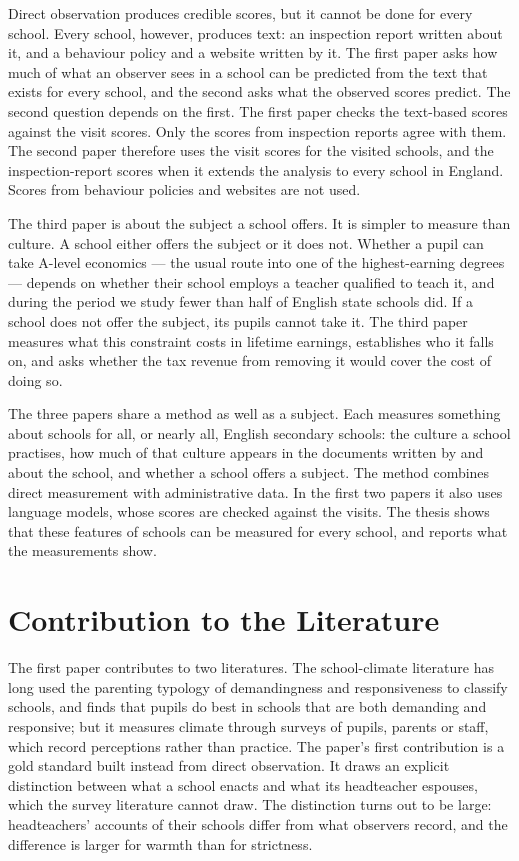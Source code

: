 Direct observation produces credible scores, but it cannot be done for
every school. Every school, however, produces text: an
inspection report written about it, and a behaviour policy and a website
written by it. The first paper asks how much of what an observer sees in a school
can be predicted from the text that exists for every school, and the second asks
what the observed scores predict. The second question depends on the
first. The first paper checks the text-based scores against the visit
scores. Only the scores from inspection reports agree with them. The second
paper therefore uses the visit scores for the visited schools, and the
inspection-report scores when it extends the analysis to every school in
England. Scores from behaviour policies and websites are not used.

The third paper is about the subject a school offers. It is simpler to measure than
culture. A school either offers the subject or it does not. Whether a pupil can take A-level
economics --- the usual route into one of the highest-earning degrees
--- depends on whether their school employs a teacher qualified to teach
it, and during the period we study fewer than half of English state
schools did. If a school does not offer the subject, its pupils cannot take
it. The
third paper measures what this constraint costs in lifetime earnings,
establishes who it falls on, and asks whether the tax revenue from removing
it would cover the cost of doing so.

The three papers share a method as well as a subject. Each measures
something about schools for all, or nearly all, English secondary schools:
the culture a school practises, how much of that culture appears in the
documents written by and about the school, and whether a school offers a
subject. The method combines direct measurement with
administrative data. In the first two papers it also uses language models,
whose scores are checked against the visits. The thesis shows that these
features of schools can be measured for every school, and reports what the
measurements show.

\section{Contribution to the Literature}
\label{sec:intro_contribution}

The first paper contributes to two literatures. The school-climate
literature has long used the parenting typology of demandingness and
responsiveness to classify schools, and finds that pupils do best in
schools that are both demanding and responsive; but it measures climate
through surveys of pupils, parents or staff, which record perceptions
rather than practice. The paper's first contribution is a gold standard
built instead from direct observation. It draws an explicit distinction
between what a school enacts and what its headteacher espouses, which the
survey literature cannot draw. The distinction turns out to be large:
headteachers' accounts of their schools differ from what observers record,
and the difference is larger for warmth than for strictness.

